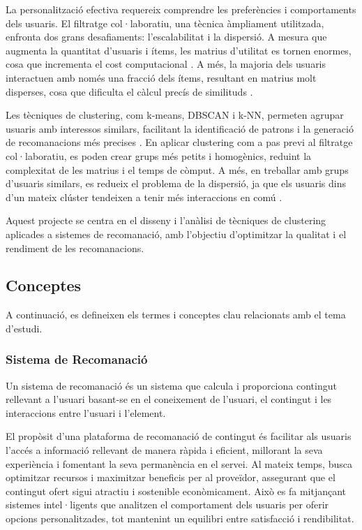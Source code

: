 \documentclass[a4paper,12pt]{report}
\begin{document}
La personalització efectiva requereix comprendre les preferències i comportaments dels usuaris.
El filtratge col·laboratiu, una tècnica àmpliament utilitzada, enfronta dos grans desafiaments: l'escalabilitat i la dispersió.
A mesura que augmenta la quantitat d'usuaris i ítems, les matrius d'utilitat es tornen enormes, cosa que incrementa el cost computacional \cite{sarwar2001item}.
A més, la majoria dels usuaris interactuen amb només una fracció dels ítems, resultant en matrius molt disperses, cosa que dificulta el càlcul precís de similituds \cite{adomavicius2005toward}.

Les tècniques de clustering, com k-means, DBSCAN i k-NN, permeten agrupar usuaris amb interessos similars, facilitant la identificació de patrons i la generació de recomanacions més precises \cite{jain2008data}.
En aplicar clustering com a pas previ al filtratge col·laboratiu, es poden crear grups més petits i homogènics, reduint la complexitat de les matrius i el temps de còmput.
A més, en treballar amb grups d'usuaris similars, es redueix el problema de la dispersió, ja que els usuaris dins d'un mateix clúster tendeixen a tenir més interaccions en comú \cite{Kantor_Ricci_Rokach_Shapira_2011}.

Aquest projecte se centra en el disseny i l'anàlisi de tècniques de clustering aplicades a sistemes de recomanació, amb l'objectiu d'optimitzar la qualitat i el rendiment de les recomanacions.

\subsection{Conceptes}

A continuació, es defineixen els termes i conceptes clau relacionats amb el tema d'estudi.

\subsubsection{Sistema de Recomanació}

Un sistema de recomanació és un sistema que calcula i proporciona contingut rellevant a l'usuari basant-se en el coneixement de l'usuari, el contingut i les interaccions entre l'usuari i l'element. \cite{falk2019practical}

El propòsit d’una plataforma de recomanació de contingut és facilitar als usuaris l’accés a informació rellevant de manera ràpida i eficient, millorant la seva experiència i fomentant la seva permanència en el servei. Al mateix temps, busca optimitzar recursos i maximitzar beneficis per al proveïdor, assegurant que el contingut ofert sigui atractiu i sostenible econòmicament. Això es fa mitjançant sistemes intel·ligents que analitzen el comportament dels usuaris per oferir opcions personalitzades, tot mantenint un equilibri entre satisfacció i rendibilitat.
\end{document}
